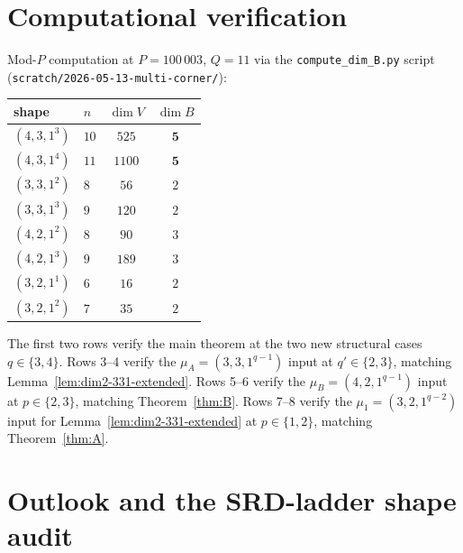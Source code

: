 \documentclass[11pt]{article}
\theoremstyle{definition}
\begin{document}
\section{Computational verification}\label{sec:comp}

Mod-$P$ computation at $P = 100\,003$, $Q = 11$ via the
\texttt{compute\_dim\_B.py} script (\texttt{scratch/2026-05-13-multi-corner/}):

\begin{center}
\renewcommand{\arraystretch}{1.15}
\begin{tabular}{llcc}
\toprule
shape & $n$ & $\dim V$ & $\dim B$ \\
\midrule
$(4, 3, 1^3)$ & $10$ & $525$ & $\mathbf{5}$ \\
$(4, 3, 1^4)$ & $11$ & $1100$ & $\mathbf{5}$ \\
$(3, 3, 1^2)$ & $8$ & $56$ & $2$ \\
$(3, 3, 1^3)$ & $9$ & $120$ & $2$ \\
$(4, 2, 1^2)$ & $8$ & $90$ & $3$ \\
$(4, 2, 1^3)$ & $9$ & $189$ & $3$ \\
$(3, 2, 1^1)$ & $6$ & $16$ & $2$ \\
$(3, 2, 1^2)$ & $7$ & $35$ & $2$ \\
\bottomrule
\end{tabular}
\end{center}

The first two rows verify the main theorem at the two new structural
cases $q \in \{3, 4\}$. Rows 3--4 verify the
$\mu_A = (3, 3, 1^{q-1})$ input at $q' \in \{2, 3\}$, matching
Lemma~\ref{lem:dim2-331-extended}. Rows 5--6 verify the
$\mu_B = (4, 2, 1^{q-1})$ input at $p \in \{2, 3\}$, matching
Theorem~\ref{thm:B}. Rows 7--8 verify the $\mu_1 = (3, 2, 1^{q-2})$
input for Lemma~\ref{lem:dim2-331-extended} at $p \in \{1, 2\}$,
matching Theorem~\ref{thm:A}.

\section{Outlook and the SRD-ladder shape audit}\label{sec:outlook}
\end{document}
